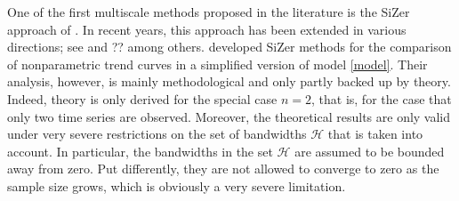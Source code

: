 \documentclass[a4paper,12pt]{article}
\begin{document}
\begin{itemize}[label=--,leftmargin=0.5cm]


One of the first multiscale methods proposed in the literature is the SiZer approach of \cite{ChaudhuriMarron1999, ChaudhuriMarron2000}. In recent years, this approach has been extended in various directions; see \cite{HannigMarron2006} and ?? among others. \cite{Park2009} developed SiZer methods for the comparison of nonparametric trend curves in a simplified version of model \eqref{model}. Their analysis, however, is mainly methodological and only partly backed up by theory. Indeed, theory is only derived for the special case $n=2$, that is, for the case that only two time series are observed. Moreover, the theoretical results are only valid under very severe restrictions on the set of bandwidths $\mathcal{H}$ that is taken into account. In particular, the bandwidths in the set $\mathcal{H}$ are assumed to be bounded away from zero. Put differently, they are not allowed to converge to zero as the sample size grows, which is obviously a very severe limitation. 



\end{itemize}
\end{document}
